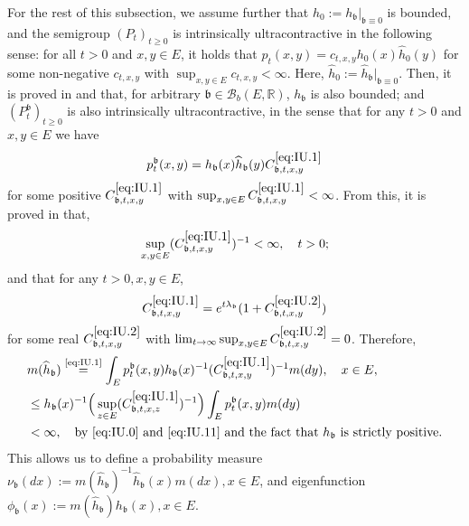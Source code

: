\documentclass[12pt,a4paper]{amsart}
\numberwithin{equation}{section}
\theoremstyle{plain}
\theoremstyle{definition}
\theoremstyle{remark}
\begin{document}
	For the rest of this subsection, we assume further that $h_0:= h_\mathfrak b|_{\mathfrak{b} \equiv 0}$ is bounded, and the semigroup $(P_t)_{t\geq 0}$ is intrinsically ultracontractive in the following sense: for all $t>0$ and $x, y \in E$, it holds that $p_t(x,y) = c_{t,x,y} h_0(x) \widehat h_0(y)$ for some non-negative $c_{t,x,y}$ with $\sup_{x,y \in E} c_{t,x,y}< \infty$.
	Here, $\widehat h_0 := \widehat h_\mathfrak b|_{\mathfrak{b}\equiv 0}$.
	Then, it is proved in \cite{RenSongZhang2015Limit} and \cite{RenSongZhang2017Central} that, for arbitrary $\mathfrak b \in \mathcal B_b(E,\mathbb R)$, $h_\mathfrak b$ is also bounded; and $(P_t^\mathfrak b)_{t\geq 0}$ is also intrinsically ultracontractive, in the sense that for any $t> 0$ and $x,y \in E$ we have
\begin{equation} \label{eq:IU.1}
	p^\mathfrak b_t(x,y)
	= h_\mathfrak b(x) \widehat h_\mathfrak b (y) C^{\eqref{eq:IU.1}}_{\mathfrak b,t,x,y}
\end{equation}
	for some positive $C^{\eqref{eq:IU.1}}_{\mathfrak b,t,x,y}$ with $\sup_{x,y \in E} C^{\eqref{eq:IU.1}}_{\mathfrak b,t,x,y}< \infty$.
	From this, it is proved in \cite{KimSong2008Intrinsic} that,
\begin{equation} \label{eq:IU.11}
	\sup_{x,y \in E} (C^{\eqref{eq:IU.1}}_{\mathfrak b,t,x,y})^{-1}
	< \infty,
	\quad t>0;
\end{equation}
	and that for any $t>0, x,y \in E$,
\begin{equation}\label{eq:IU.2}
	C^{\eqref{eq:IU.1}}_{\mathfrak b,t,x,y}
	= e^{t\lambda_\mathfrak{b}} (1+ C^{\eqref{eq:IU.2}}_{\mathfrak b,t,x,y})
\end{equation}
	for some real $C^{\eqref{eq:IU.2}}_{\mathfrak b,t,x,y}$ with $\lim_{t\to \infty} \sup_{x,y \in E} C^{\eqref{eq:IU.2}}_{\mathfrak b,t,x,y} =0$.
	Therefore,
\begin{align}
	& m(\widehat h_{\mathfrak b}) \overset{\text{\eqref{eq:IU.1}}}= \int_{E} p_t^\mathfrak{b}(x,y)h_\mathfrak{b}(x)^{-1} (C^{\eqref{eq:IU.1}}_{\mathfrak b,t,x,y})^{-1} m(dy), \quad x\in E,
	\\&\leq  h_\mathfrak{b}(x)^{-1} \Big(\sup_{z\in E}(C^{\eqref{eq:IU.1}}_{\mathfrak b,t,x,z})^{-1}\Big)  \int_{E} p_t^\mathfrak{b}(x,y)m(dy)
	\\& < \infty,\quad\text{by \eqref{eq:IU.0} and \eqref{eq:IU.11} and the fact that $h_\mathfrak{b}$ is strictly positive}.
\end{align}
	This allows us to define a probability measure $\nu_\mathfrak b (dx):= m(\widehat h_{\mathfrak b})^{-1} \widehat h_\mathfrak b (x)m(dx), x\in E$, and eigenfunction $\phi_\mathfrak{b}(x) := m(\widehat h_{\mathfrak b}) h_\mathfrak b(x), x\in E$.
\end{document}
